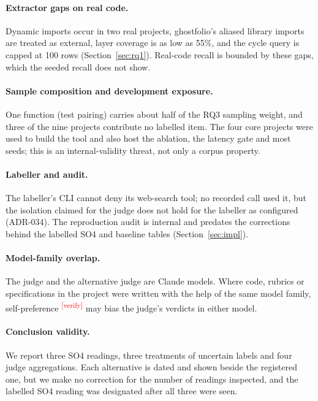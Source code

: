 \documentclass[10pt,a4paper]{article}
\newcommand{\citeneeded}[1]{\cite{#1}\textsuperscript{\textcolor{red}{\tiny[verify]}}}
\begin{document}
\paragraph{Extractor gaps on real code.}
Dynamic imports occur in two real projects, ghostfolio's aliased library imports are treated as external, layer
coverage is as low as 55\%, and the cycle query is capped at 100 rows (Section~\ref{sec:rq1}). Real-code recall is
bounded by these gaps, which the seeded recall does not show.

\paragraph{Sample composition and development exposure.}
One function (test pairing) carries about half of the RQ3 sampling weight, and three of the nine projects
contribute no labelled item. The four core projects were used to build the tool and also host the ablation, the
latency gate and most seeds; this is an internal-validity threat, not only a corpus property.

\paragraph{Labeller and audit.}
The labeller's CLI cannot deny its web-search tool; no recorded call used it, but the isolation claimed for the
judge does not hold for the labeller as configured (ADR-034). The reproduction audit is internal and predates the
corrections behind the labelled SO4 and baseline tables (Section~\ref{sec:impl}).

\paragraph{Model-family overlap.}
The judge and the alternative judge are Claude models. Where code, rubrics or specifications in the project were
written with the help of the same model family, self-preference \citeneeded{panickssery2024self} may bias the
judge's verdicts in either model.

\paragraph{Conclusion validity.}
We report three SO4 readings, three treatments of uncertain labels and four judge aggregations. Each alternative is
dated and shown beside the registered one, but we make no correction for the number of readings inspected, and the
labelled SO4 reading was designated after all three were seen.
\end{document}

